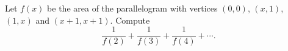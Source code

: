 Let $f(x)$ be the area of the parallelogram with vertices $(0,0)$, $(x,1)$, $(1,x)$ and $(x+1,x+1)$. Compute
\[
\dfrac{1}{f(2)}+\dfrac{1}{f(3)}+\dfrac{1}{f(4)}+\cdots .
\]
